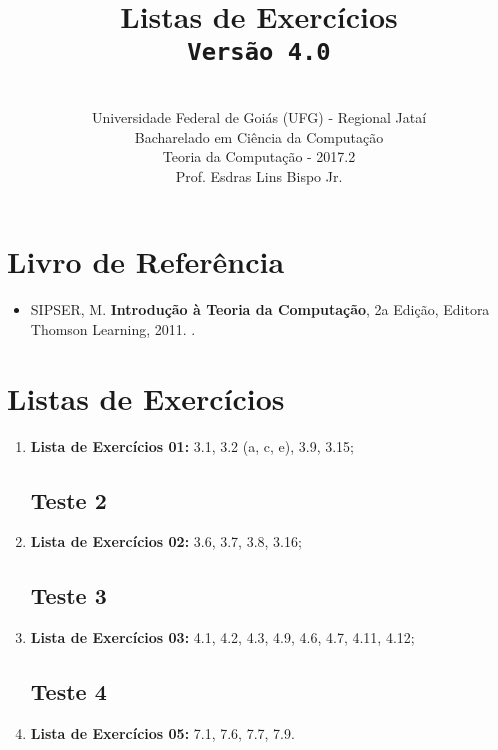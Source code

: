 \documentclass[12pt,a4paper,oneside]{article}
\author{\\Universidade Federal de Goiás (UFG) - Regional Jataí\\Bacharelado em Ciência da Computação \\Teoria da Computação - 2017.2 \\Prof. Esdras Lins Bispo Jr.}
\date{}
\title{
	\sc \huge Listas de Exercícios
	\\{\tt Versão 4.0}
}
\begin{document}
\maketitle

\section{Livro de Referência}
	\begin{itemize}
		\item SIPSER, M. {\bf Introdução à Teoria da Computação}, 2a Edição, Editora Thomson Learning, 2011. \color{blue}{\bf Código Bib.: [004 SIP/int]}.
	\end{itemize}
	
\section{Listas de Exercícios}

\begin{enumerate}

	\subsection{Teste 1}
	\item[] {\bf Lista de Exercícios 01:} 3.1, 3.2 (a, c, e), 3.9, 3.15;
	
	\subsection{Teste 2}
	
	\item[] {\bf Lista de Exercícios 02:} 3.6, 3.7, 3.8, 3.16;
%	
%	
	\subsection{Teste 3}
	\item[] {\bf Lista de Exercícios 03:} 4.1, 4.2, 4.3, 4.9, 4.6, 4.7, 4.11, 4.12;
%	
	\subsection{Teste 4}
%	
	\item[] {\bf Lista de Exercícios 05:} 7.1, 7.6, 7.7, 7.9.
	
\end{enumerate}
\end{document}
